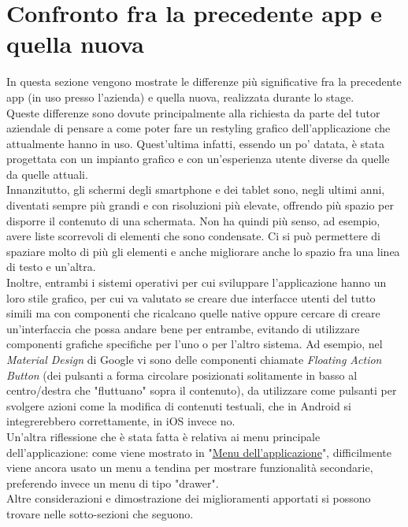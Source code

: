 \section{Confronto fra la precedente app e quella nuova}
\label{sec:confronto-precedente-app-nuova}

In questa sezione vengono mostrate le differenze più significative fra la precedente app (in uso presso l'azienda) e quella nuova, realizzata durante lo stage.\\
Queste differenze sono dovute principalmente alla richiesta da parte del tutor aziendale di pensare a come poter fare un restyling grafico dell'applicazione che attualmente hanno in uso.
Quest'ultima infatti, essendo un po' datata, è stata progettata con un impianto grafico e con un'esperienza utente diverse da quelle da quelle attuali.\\
Innanzitutto, gli schermi degli smartphone e dei tablet sono, negli ultimi anni, diventati sempre più grandi e con risoluzioni più elevate, offrendo più spazio per disporre il contenuto di una schermata.
Non ha quindi più senso, ad esempio, avere liste scorrevoli di elementi che sono condensate. Ci si può permettere di spaziare molto di più gli elementi e anche migliorare anche lo spazio fra una linea di testo e un'altra.\\
Inoltre, entrambi i sistemi operativi per cui sviluppare l'applicazione hanno un loro stile grafico, per cui va valutato se creare due interfacce utenti del tutto simili ma con componenti che ricalcano quelle native oppure cercare di creare un'interfaccia che possa andare bene per entrambe, evitando di utilizzare componenti grafiche specifiche per l'uno o per l'altro sistema.
Ad esempio, nel \emph{Material Design} di Google vi sono delle componenti chiamate \emph{Floating Action Button} (dei pulsanti a forma circolare posizionati solitamente in basso al centro/destra che "fluttuano" sopra il contenuto), da utilizzare come pulsanti per svolgere azioni come la modifica di contenuti testuali, che in Android si integrerebbero correttamente, in iOS invece no.\\
Un'altra riflessione che è stata fatta è relativa ai menu principale dell'applicazione: come viene mostrato in "\hyperref[subsec:menu-applicazione]{Menu dell'applicazione}", difficilmente viene ancora usato un menu a tendina per mostrare funzionalità secondarie, preferendo invece un menu di tipo "drawer".\\
Altre considerazioni e dimostrazione dei miglioramenti apportati si possono trovare nelle sotto-sezioni che seguono.


